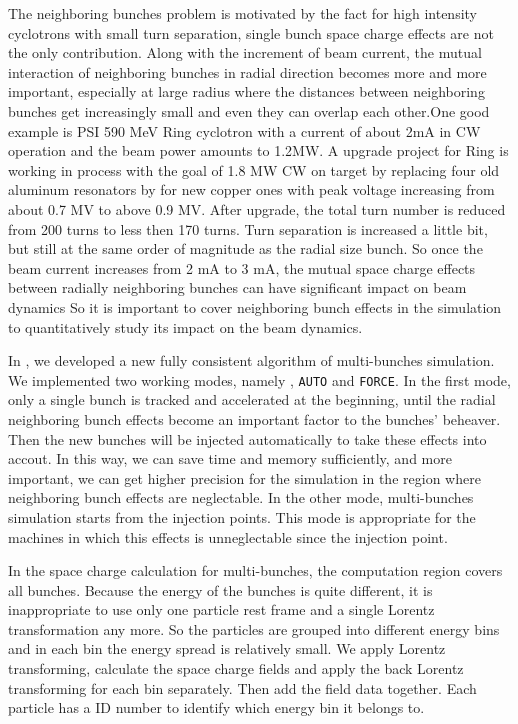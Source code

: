 The neighboring bunches problem is motivated by the fact  for high intensity cyclotrons with small turn
separation, single bunch space charge effects are not the only contribution. Along with the increment of beam
current, the mutual interaction of neighboring bunches in radial direction becomes more and more important,
especially at large radius where the distances between neighboring bunches get increasingly small and even they
can overlap each other.One good example is PSI 590 MeV Ring cyclotron with a current of about 2mA in
CW operation and the beam power amounts to 1.2MW. A upgrade project for Ring is working in process with
the goal of 1.8 MW CW on target by replacing four old aluminum resonators by for new copper ones with peak
voltage increasing from about 0.7 MV to above 0.9 MV. After upgrade, the total turn 
number is reduced from 200 turns to less then 170 turns. 
Turn separation is increased a little bit, but still at the same order 
of magnitude as the radial size bunch. So once the beam current increases from 2 mA to 3 mA, the mutual space
charge effects between radially neighboring bunches can have significant impact on beam dynamics 
So it is important to cover neighboring bunch effects in the simulation to quantitatively study its impact on the beam dynamics.

In \opalcycl, we developed a new fully consistent algorithm of multi-bunches simulation.  We implemented two working modes, namely , 
\texttt{AUTO} and \texttt{FORCE}. In the first mode, only a single bunch is tracked and accelerated at the beginning,
until the radial neighboring bunch effects become an important factor to the bunches' beheaver. Then the new bunches will be injected automatically to 
take these effects into accout. In this way, we can save time and memory sufficiently, and more important, 
we can get higher precision for the simulation in the region where neighboring bunch effects are neglectable.
In the other mode, multi-bunches simulation starts from the injection points. This mode is appropriate for the machines in which this effects is 
unneglectable since the injection point.    

In the space charge calculation for multi-bunches, the computation region covers all bunches.
Because the energy of the bunches is quite different, it is inappropriate to use only one particle rest frame and a single Lorentz transformation any more.
So the particles are grouped into different energy bins and in each bin the energy spread is relatively small. We apply Lorentz transforming, calculate
the space charge fields and apply the back Lorentz transforming for each bin separately. Then add the field data together. Each particle has a ID number to identify 
which energy bin it belongs to.

